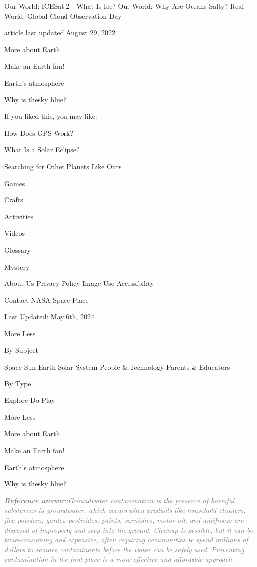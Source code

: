 \documentclass[a4paper,11pt]{article}
\begin{document}
\begin{docenv}
{Our World: ICESat-2 - What Is Ice?
Our World: Why Are Oceans Salty?
Real World: Global Cloud Observation Day

 	article last updated August 29, 2022
 

More about Earth

Make an Earth fan!

Earth's atmosphere

Why is thesky blue?

If you liked this, you may like:

How Does GPS Work?

What Is a Solar Eclipse?

Searching for Other Planets Like Ours

	 Games	 

	 Crafts	 

	 Activities	 

	 Videos	 

	 Glossary	 

	 Mystery	 

About Us
Privacy Policy
Image Use
Accessibility

Contact NASA Space Place

 Last Updated: May 6th, 2024 

 

More
Less

By Subject

Space
Sun
Earth
Solar System
People \& Technology
Parents \& Educators

By Type

Explore
Do
Play

More
Less

More about Earth

Make an Earth fan!

Earth's atmosphere

Why is thesky blue?

}
\end{docenv}
\begin{refanswerenv}
{\footnotesize\textit{\textcolor{gray}{\textbf{Reference answer:}\enspace Groundwater contamination is the presence of harmful substances in groundwater, which occurs when products like household cleaners, flea powders, garden pesticides, paints, varnishes, motor oil, and antifreeze are disposed of improperly and seep into the ground.
Cleanup is possible, but it can be time-consuming and expensive, often requiring communities to spend millions of dollars to remove contaminants before the water can be safely used. Preventing contamination in the first place is a more effective and affordable approach.}}}
\end{refanswerenv}
\end{document}
